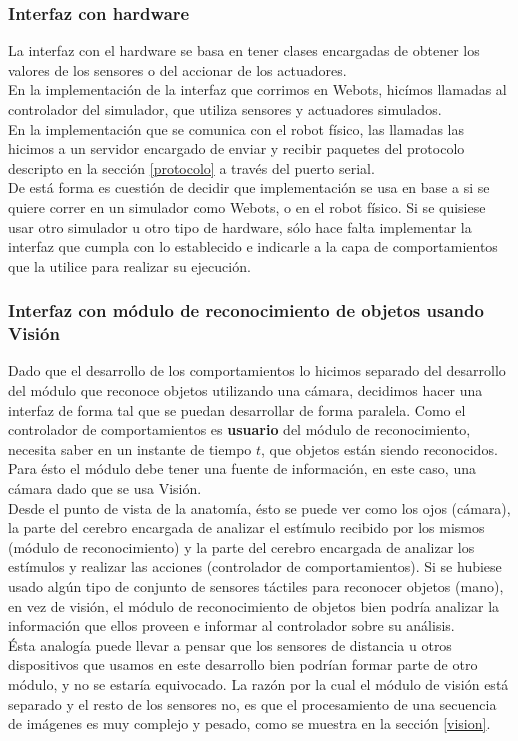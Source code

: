 \subsubsection{Interfaz con hardware}
La interfaz con el hardware se basa en tener clases encargadas de obtener los valores de los sensores
o del accionar de los actuadores.
\\En la implementaci\'on de la interfaz que corrimos en Webots, hic\'imos
llamadas al controlador del simulador, que utiliza sensores y actuadores simulados.
\\En la implementaci\'on que se comunica con el robot f\'isico,
las llamadas las hicimos a un servidor encargado de enviar y recibir paquetes del protocolo descripto
en la secci\'on \ref{protocolo} a trav\'es del puerto serial.
\\De est\'a forma es cuesti\'on de decidir que implementaci\'on se usa en base a si se quiere
correr en un simulador como Webots, o en el robot f\'isico. Si se quisiese usar otro simulador
u otro tipo de hardware, s\'olo hace falta implementar la interfaz que cumpla con lo establecido e
indicarle a la capa de comportamientos que la utilice para realizar su ejecuci\'on.

\subsubsection{Interfaz con m\'odulo de reconocimiento de objetos usando Visi\'on}
Dado que el desarrollo de los comportamientos lo hicimos separado del desarrollo del
m\'odulo que reconoce objetos utilizando una c\'amara, decidimos hacer una interfaz de
forma tal que se puedan desarrollar de forma paralela.
Como el controlador de comportamientos es \textbf{usuario} del m\'odulo de reconocimiento,
necesita saber en un instante de tiempo $t$, que objetos est\'an siendo reconocidos. Para \'esto
el m\'odulo debe tener una fuente de informaci\'on, en este caso, una c\'amara dado que se usa
Visi\'on.
\\
Desde el punto de vista de la anatom\'ia, \'esto se puede ver como los ojos (c\'amara), la parte del cerebro
encargada de analizar el est\'imulo recibido por los mismos (m\'odulo de reconocimiento) y la parte del cerebro
encargada de analizar los est\'imulos y realizar las acciones (controlador de comportamientos). Si se hubiese
usado alg\'un tipo de conjunto de sensores t\'actiles para reconocer objetos (mano), en vez de visi\'on, 
el m\'odulo de reconocimiento de objetos bien podr\'ia analizar la informaci\'on que ellos proveen e
informar al controlador sobre su an\'alisis.
\\
\'Esta analog\'ia puede llevar a pensar que los sensores de distancia u otros dispositivos que usamos
en este desarrollo bien podr\'ian formar parte de otro m\'odulo, y no se estar\'ia equivocado. La raz\'on
por la cual el m\'odulo de visi\'on est\'a separado y el resto de los sensores no, es que el procesamiento
de una secuencia de im\'agenes es muy complejo y pesado, como se muestra en la secci\'on \ref{vision}.

